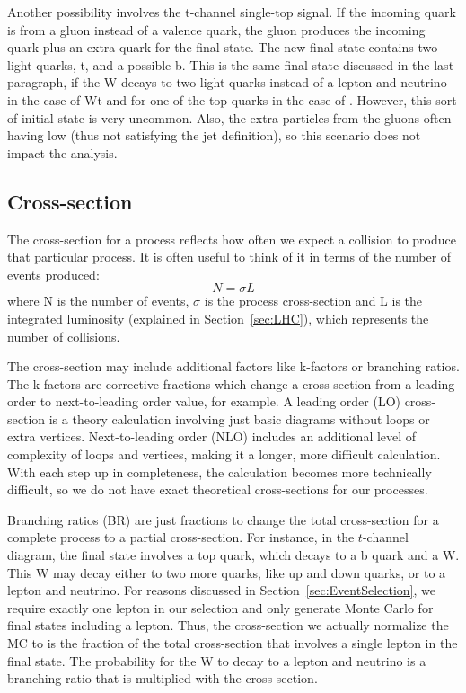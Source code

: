 Another possibility involves the t-channel single-top signal.  If the incoming quark is from a gluon instead of a valence quark, the gluon produces the incoming quark plus an extra quark for the final state.  The new final state contains two light quarks, t, and a possible b.  This is the same final state discussed in the last paragraph, if the W decays to two light quarks instead of a lepton and neutrino in the case of Wt and for one of the top quarks in the case of \ttbar.  However, this sort of initial state is very uncommon.  Also, the extra particles from the gluons often having low \pt (thus not satisfying the jet definition), so this scenario does not impact the analysis.

\subsection{Cross-section}
 \label{sec:ExpectedCrosssections}
The cross-section for a process reflects how often we expect a collision to produce that particular process.  It is often useful to think of it in terms of the number of events produced:
\begin{equation} N = \sigma L \label{equ:numberofevents} \end{equation}
where N is the number of events, $\sigma$ is the process cross-section and L is the integrated luminosity (explained in Section~\ref{sec:LHC}), which represents the number of collisions.

The cross-section may include additional factors like k-factors or branching ratios.  The k-factors are corrective fractions which change a cross-section from a leading order to next-to-leading order value, for example.  A leading order (LO) cross-section is a theory calculation involving just basic diagrams without loops or extra vertices.  Next-to-leading order (NLO) includes an additional level of complexity of loops and vertices, making it a longer, more difficult calculation.  With each step up in completeness, the calculation becomes more technically difficult, so we do not have exact theoretical cross-sections for our processes.  

Branching ratios (BR) are just fractions to change the total cross-section for a complete process to a partial cross-section.  For instance, in the $t$-channel diagram, the final state involves a top quark, which decays to a b quark and a W.  This W may decay either to two more quarks, like up and down quarks, or to a lepton and neutrino.  For reasons discussed in Section~\ref{sec:EventSelection}, we require exactly one lepton in our selection and only generate Monte Carlo for final states including a lepton.  Thus, the cross-section we actually normalize the MC to is the fraction of the total cross-section that involves a single lepton in the final state.  The probability for the W to decay to a lepton and neutrino is a branching ratio that is multiplied with the cross-section.

